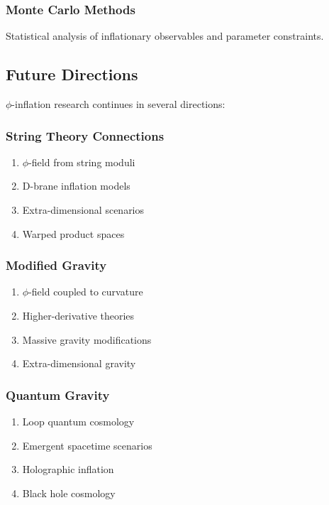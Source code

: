 \subsubsection{Monte Carlo Methods}

Statistical analysis of inflationary observables and parameter constraints.

\subsection{Future Directions}

$\phi$-inflation research continues in several directions:

\subsubsection{String Theory Connections}

\begin{enumerate}
\item $\phi$-field from string moduli
\item D-brane inflation models  
\item Extra-dimensional scenarios
\item Warped product spaces
\end{enumerate}

\subsubsection{Modified Gravity}

\begin{enumerate}
\item $\phi$-field coupled to curvature
\item Higher-derivative theories
\item Massive gravity modifications
\item Extra-dimensional gravity
\end{enumerate}

\subsubsection{Quantum Gravity}

\begin{enumerate}
\item Loop quantum cosmology
\item Emergent spacetime scenarios
\item Holographic inflation
\item Black hole cosmology
\end{enumerate}

